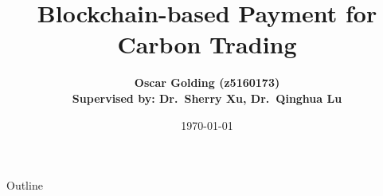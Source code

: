 \documentclass{beamer}
\title{Blockchain-based Payment for Carbon Trading}
\author[Oscar Golding]
{\textbf{Oscar Golding (z5160173)
\texorpdfstring{\\} 
\footnotesize Supervised by: Dr.~Sherry Xu, Dr.~Qinghua Lu}}
\institute[UNSW]{Thesis A: UNSW}
\date{\today}
\begin{document}
\begin{frame}
    \titlepage
\end{frame}

\begin{frame}{Outline}
    \tableofcontents
\end{frame}




\end{document}
